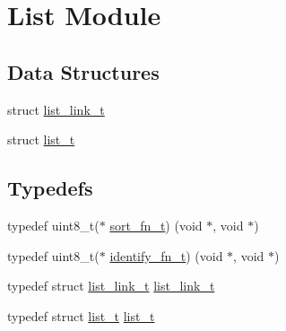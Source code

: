 \hypertarget{group__list}{}\section{List Module}
\label{group__list}
\subsection*{Data Structures}
\begin{DoxyCompactItemize}
\item 
struct \hyperlink{structlist__link__t}{list\+\_\+link\+\_\+t}
\item 
struct \hyperlink{structlist__t}{list\+\_\+t}
\end{DoxyCompactItemize}
\subsection*{Typedefs}
\begin{DoxyCompactItemize}
\item 
typedef uint8\+\_\+t($\ast$ \hyperlink{group__list_gaec41fb00279c4e4ec77286fa803cbcd2}{sort\+\_\+fn\+\_\+t}) (void $\ast$, void $\ast$)
\item 
typedef uint8\+\_\+t($\ast$ \hyperlink{group__list_ga608e5ebc97d34a9cd07a2c44925a1dc2}{identify\+\_\+fn\+\_\+t}) (void $\ast$, void $\ast$)
\item 
typedef struct \hyperlink{structlist__link__t}{list\+\_\+link\+\_\+t} \hyperlink{group__list_ga072d443e962ee5e68a26011a5089325c}{list\+\_\+link\+\_\+t}
\item 
typedef struct \hyperlink{structlist__t}{list\+\_\+t} \hyperlink{group__list_gac466ff011100add5899254ca98ff8b93}{list\+\_\+t}
\end{DoxyCompactItemize}
